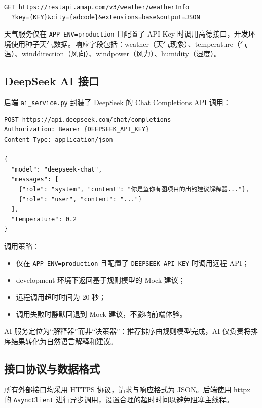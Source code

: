 \documentclass[12pt,a4paper]{ctexart}
\begin{document}
\begin{lstlisting}[caption={高德天气 API 调用方式},label={lst:amap-weather}]
GET https://restapi.amap.com/v3/weather/weatherInfo
  ?key={KEY}&city={adcode}&extensions=base&output=JSON
\end{lstlisting}

天气服务仅在 \texttt{APP\_ENV=production} 且配置了 API Key 时调用高德接口，开发环境使用种子天气数据。响应字段包括：weather（天气现象）、temperature（气温）、winddirection（风向）、windpower（风力）、humidity（湿度）。

\subsection{DeepSeek AI 接口}

后端 \texttt{ai\_service.py} 封装了 DeepSeek 的 Chat Completions API 调用：

\begin{lstlisting}[caption={DeepSeek API 调用方式},label={lst:deepseek}]
POST https://api.deepseek.com/chat/completions
Authorization: Bearer {DEEPSEEK_API_KEY}
Content-Type: application/json

{
  "model": "deepseek-chat",
  "messages": [
    {"role": "system", "content": "你是鱼你有图项目的出钓建议解释器..."},
    {"role": "user", "content": "..."}
  ],
  "temperature": 0.2
}
\end{lstlisting}

调用策略：
\begin{itemize}
  \item 仅在 \texttt{APP\_ENV=production} 且配置了 \texttt{DEEPSEEK\_API\_KEY} 时调用远程 API；
  \item development 环境下返回基于规则模型的 Mock 建议；
  \item 远程调用超时时间为 20 秒；
  \item 调用失败时静默回退到 Mock 建议，不影响前端体验。
\end{itemize}

AI 服务定位为“解释器”而非“决策器”：推荐排序由规则模型完成，AI 仅负责将排序结果转化为自然语言解释和建议。

\subsection{接口协议与数据格式}

所有外部接口均采用 HTTPS 协议，请求与响应格式为 JSON。后端使用 httpx 的 \texttt{AsyncClient} 进行异步调用，设置合理的超时时间以避免阻塞主线程。
\end{document}
